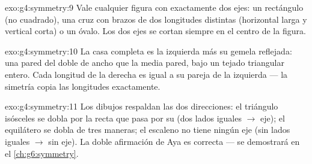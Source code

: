 \begin{solution}{exo:g4:symmetry:9}
Vale cualquier figura con exactamente dos ejes: un rectángulo (no cuadrado), una
cruz con brazos de dos longitudes distintas (horizontal larga y vertical
corta) o un óvalo. Los dos ejes se cortan siempre en el centro de la
figura.
\end{solution}

\begin{solution}{exo:g4:symmetry:10}
La casa completa es la  izquierda más su gemela reflejada: una pared
del doble de ancho que la media pared, bajo un tejado triangular entero. Cada
longitud de la derecha es igual a su pareja de la izquierda --- la simetría
copia las longitudes exactamente.
\end{solution}

\begin{solution}{exo:g4:symmetry:11}
Los dibujos respaldan las dos direcciones: el triángulo isósceles se dobla
por la recta que pasa por su  (dos lados iguales $\to$ eje); el
equilátero se dobla de tres maneras; el escaleno no tiene ningún eje (sin
lados iguales $\to$ sin eje). La doble afirmación de Aya es correcta --- se
demostrará en el \cref{ch:g6:symmetry}.
\end{solution}
